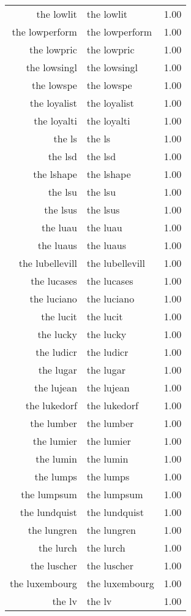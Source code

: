 \begin{table}[ht]
\begin{tabular}{rlr}
  the lowlit & the lowlit & 1.00 \\ 
  the lowperform & the lowperform & 1.00 \\ 
  the lowpric & the lowpric & 1.00 \\ 
  the lowsingl & the lowsingl & 1.00 \\ 
  the lowspe & the lowspe & 1.00 \\ 
  the loyalist & the loyalist & 1.00 \\ 
  the loyalti & the loyalti & 1.00 \\ 
  the ls & the ls & 1.00 \\ 
  the lsd & the lsd & 1.00 \\ 
  the lshape & the lshape & 1.00 \\ 
  the lsu & the lsu & 1.00 \\ 
  the lsus & the lsus & 1.00 \\ 
  the luau & the luau & 1.00 \\ 
  the luaus & the luaus & 1.00 \\ 
  the lubellevill & the lubellevill & 1.00 \\ 
  the lucases & the lucases & 1.00 \\ 
  the luciano & the luciano & 1.00 \\ 
  the lucit & the lucit & 1.00 \\ 
  the lucky & the lucky & 1.00 \\ 
  the ludicr & the ludicr & 1.00 \\ 
  the lugar & the lugar & 1.00 \\ 
  the lujean & the lujean & 1.00 \\ 
  the lukedorf & the lukedorf & 1.00 \\ 
  the lumber & the lumber & 1.00 \\ 
  the lumier & the lumier & 1.00 \\ 
  the lumin & the lumin & 1.00 \\ 
  the lumps & the lumps & 1.00 \\ 
  the lumpsum & the lumpsum & 1.00 \\ 
  the lundquist & the lundquist & 1.00 \\ 
  the lungren & the lungren & 1.00 \\ 
  the lurch & the lurch & 1.00 \\ 
  the luscher & the luscher & 1.00 \\ 
  the luxembourg & the luxembourg & 1.00 \\ 
  the lv & the lv & 1.00 \\ 

\end{tabular}
\end{table}
